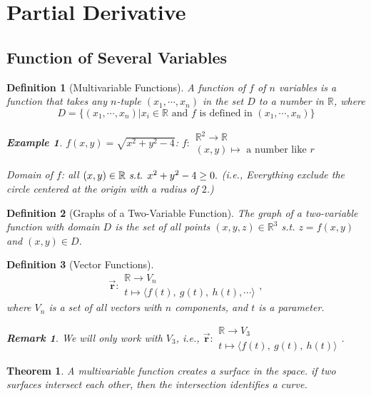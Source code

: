 \documentclass[12pt,a4paper]{article}
\newtheorem{thm}{Theorem}[subsection]
\newtheorem{df}{Definition}[subsection]
\newtheorem{eg}{Example}[subsection]
\newtheorem*{rmk}{\indent Remark}
\def\R{{\mathbb{R}}}
\def\vecr{\vec{\boldsymbol{\textbf{r}}}}
\begin{document}
\newpage
\section{Partial Derivative}
\subsection{Function of Several Variables}
\begin{df}[Multivariable Functions]
	A function of $f$ of $n$ variables is a function that takes any $n$-tuple $(x_1,\cdots,x_n)$ in the set $D$ to a number in $\R$, where \[D=\bigg\{(x_1,\cdots,x_n)|x_i\in\R\text{ and }f\text{ is defined in }(x_1,\cdots,x_n)\bigg\}\]	
	\begin{eg}
		$f(x,y)=\sqrt{x^2+y^2-4}$: $f:\begin{array}{l}\R^2\longrightarrow\R\\ (x,y)\longmapsto\text{ a number like }r\end{array}$	
		
		Domain of $f$: all $(x,y)\in\R\emph{ s.t. }x^2+y^2-4\geq0.$ (i.e., Everything exclude the circle centered at the origin with a radius of $2$.)
	\end{eg}
\end{df}
\begin{df}[Graphs of a Two-Variable Function]
	The graph of a two-variable function with domain $D$ is the set of all points $(x,y,z)\in\R^3$ \emph{s.t.} $z=f(x,y)$ and $(x,y)\in D$.	
\end{df}
\begin{df}[Vector Functions]
	\[\vecr:\begin{array}{l}\R\longrightarrow V_n\\ t\longmapsto\langle f(t),\ g(t),\ h(t),\cdots\rangle\end{array}, \] where $V_n$ is a set of all vectors with $n$ components, and $t$ is a parameter. 
	\begin{rmk}
		We will only work with $V_3$, i.e., 	$\vecr:\begin{array}{l}\R\longrightarrow V_3\\ t\longmapsto\langle f(t),\ g(t),\ h(t)\rangle\end{array}$.
	\end{rmk}
\end{df}
\begin{thm}
	A multivariable function creates a surface in the space. if two surfaces intersect each other, then the intersection identifies a curve.	
\end{thm}
\end{document}
